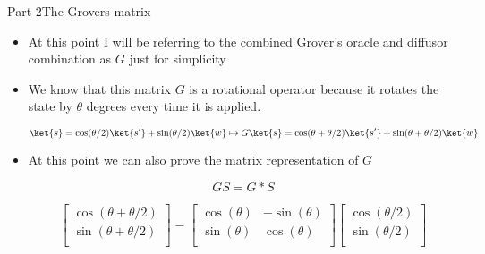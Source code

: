 \begin{frame}{Part 2}{The Grovers matrix}
\begin{itemize}
    \item At this point I will be referring to the combined Grover's oracle and diffusor combination as $G$ just for simplicity
    \item We know that this matrix $G$ is a rotational operator because it rotates the state by $\theta$ degrees every time it is applied.

    $$\ket{s} = \cos(\theta/2)\ket{s'} + \sin(\theta/2)\ket{w} \mapsto G\ket{s} = \cos(\theta + \theta/2)\ket{s'} + \sin(\theta + \theta/2)\ket{w}$$

    \item At this point we can also prove the matrix representation of $G$

    $$GS = G * S$$

    $$\begin{bmatrix}\cos(\theta + \theta/2)\\\sin(\theta + \theta/2)\\\end{bmatrix} = \begin{bmatrix}\cos(\theta) & -\sin(\theta)\\\sin(\theta) & \cos(\theta)\\\end{bmatrix} \begin{bmatrix}\cos(\theta/2)\\\sin(\theta/2)\\\end{bmatrix}$$

\end{itemize}
\end{frame}






